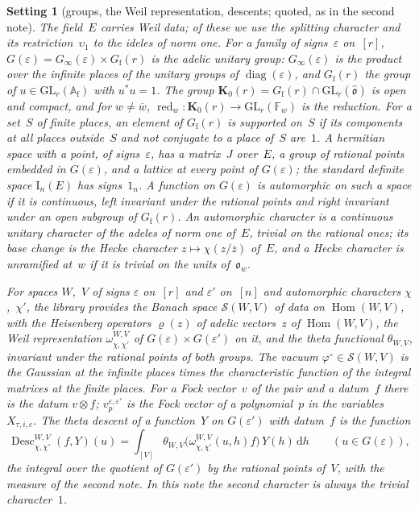 \documentclass[11pt,a4paper]{article}
\newcommand{\m}[1]{\mbox{$#1$}}        %
\theoremstyle{plainx}
\theoremstyle{uprightx}
\newtheorem{setting}[theorem]{Setting}          %
\newcommand{\AAf}{\mathbb{A}_{\mathrm{f}}}
\newcommand{\FF}{\mathbb{F}}
\newcommand{\oo}{\mathfrak{o}}
\newcommand{\ohat}{\hat{\mathfrak{o}}}
\newcommand{\Ginf}[1]{G_{\infty}(#1)}
\newcommand{\Gfin}[1]{G_{\mathrm{f}}(#1)}
\newcommand{\Gad}[1]{G(#1)}
\newcommand{\Kz}[1]{\mathbf{K}_{0}(#1)}
\newcommand{\std}[2]{\mathrm{I}_{#2}(#1)}
\newcommand{\one}[1]{1_{#1}}
\newcommand{\Desc}[4]{\operatorname{Desc}^{#1,#2}_{#3,#4}}
\newcommand{\red}[1]{\operatorname{red}_{#1}}
\newcommand{\vacf}{\varphi^{\circ}}
\newcommand{\conj}[1]{\overline{#1}}
\newcommand{\dd}{\mathrm{d}}
\begin{document}
\begin{setting}[groups, the Weil representation, descents; quoted, as in the second note]\label{s:weil}
The field~$E$ carries Weil data; of these we use the splitting character and its restriction~$\upsilon_{1}$ to
the ideles of norm one. For a family of signs~$\varepsilon$ on~$[r]$, \m{\Gad{\varepsilon}=\Ginf{\varepsilon}\times\Gfin{r}}
is the adelic unitary group: \m{\Ginf{\varepsilon}} is the product over the infinite places of the unitary groups
of \m{\operatorname{diag}(\varepsilon)}, and \m{\Gfin{r}} the group of \m{u\in\mathrm{GL}_{r}(\AAf)} with \m{u^{*}u=1}.
The group \m{\Kz{r}=\Gfin{r}\cap\mathrm{GL}_{r}(\ohat)} is open and compact, and for \m{w\ne\conj{w}},
\m{\red{w}\colon\Kz{r}\to\mathrm{GL}_{r}(\FF_{w})} is the reduction. For a set~$S$ of finite places, an element of
\m{\Gfin{r}} is \emph{supported on~$S$} if its components at all places outside~$S$ and not conjugate to a place
of~$S$ are~$1$. A hermitian space with a point, of signs~$\varepsilon$, has a matrix~$J$ over~$E$, a group of
rational points embedded in \m{\Gad{\varepsilon}}, and a lattice at every point of \m{\Gad{\varepsilon}}; the
standard definite space \m{\std{E}{n}} has signs~\m{\one{n}}. A function on \m{\Gad{\varepsilon}} is \emph{automorphic}
on such a space if it is continuous, left invariant under the rational points and right invariant under an
open subgroup of \m{\Gfin{r}}. An automorphic character is a continuous unitary character of the adeles of norm
one of~$E$, trivial on the rational ones; its \emph{base change} is the Hecke character \m{z\mapsto\chi(z/\conj{z})}
of~$E$, and a Hecke character is unramified at~$w$ if it is trivial on the units of~$\oo_{w}$.

For spaces $W$,~$V$ of signs $\varepsilon$ on~$[r]$ and $\varepsilon'$ on~$[n]$ and automorphic characters
$\chi$,~$\chi'$, the library provides the Banach space \m{\mathcal{S}(W,V)} of data on \m{\operatorname{Hom}(W,V)},
with the Heisenberg operators \m{\varrho(z)} of adelic vectors~$z$ of \m{\operatorname{Hom}(W,V)}, the Weil
representation \m{\omega^{W,V}_{\chi,\chi'}} of \m{\Gad{\varepsilon}\times\Gad{\varepsilon'}} on it, and the theta
functional \m{\theta_{W,V}}, invariant under the rational points of both groups. The vacuum
\m{\vacf\in\mathcal{S}(W,V)} is the Gaussian at the infinite places times the characteristic function of the
integral matrices at the finite places. For a Fock vector~$v$ of the pair and a datum~$f$ there is the datum
\m{v\otimes f}; \m{v^{\varepsilon,\varepsilon'}_{p}} is the Fock vector of a polynomial~$p$ in the variables
\m{X_{\tau,i,c}}. The theta descent of a function~$Y$ on \m{\Gad{\varepsilon'}} with datum~$f$ is the function
\[
\Desc{W}{V}{\chi}{\chi'}(f,Y)(u)=\int_{[V]}\theta_{W,V}\bigl(\omega^{W,V}_{\chi,\chi'}(u,h)f\bigr)\,Y(h)\,\dd h
\qquad(u\in\Gad{\varepsilon}),
\]
the integral over the quotient of \m{\Gad{\varepsilon'}} by the rational points of~$V$, with the measure of the
second note. In this note the second character is always the trivial character~$1$.
\end{setting}
\end{document}
